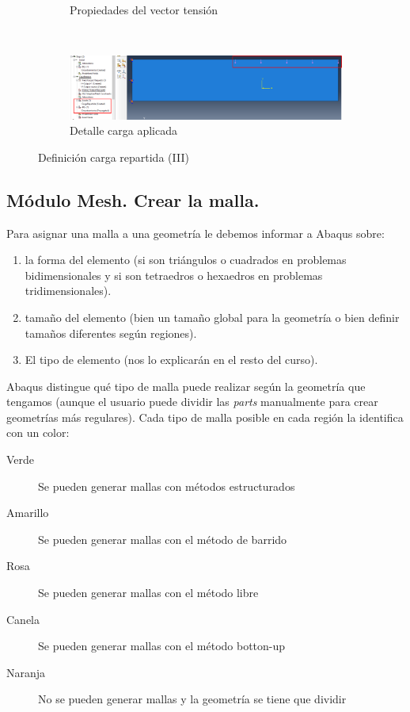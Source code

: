 \begin{enumerate}
\begin{figure}[H]
\begin{subfigure}{0.30\textwidth}
      \caption{Propiedades del vector tensión}
      \label{figu49}
    \end{subfigure}%
    ~ %
    \begin{subfigure}{0.67\textwidth}
      \includegraphics[width=\textwidth]{./body/images/imagen50.pdf}
      \caption{Detalle carga aplicada }
      \label{figu50}
    \end{subfigure}%
    \caption{Definición carga repartida (III)}
  \end{figure}
\end{enumerate}
\newpage

\subsection{Módulo Mesh. Crear la malla.}
Para asignar una malla a una geometría le debemos informar a Abaqus
sobre:
\begin{enumerate}
\item la forma del elemento (si son triángulos o cuadrados en
  problemas bidimensionales y si son tetraedros o hexaedros en
  problemas tridimensionales).
\item tamaño del elemento (bien un tamaño global para la geometría o
  bien definir tamaños diferentes según regiones).
\item El tipo de elemento (nos lo explicarán en el resto del curso).
\end{enumerate}

Abaqus distingue qué tipo de malla puede realizar según la geometría
que tengamos (aunque el usuario puede dividir las \textit{parts}
manualmente para crear geometrías más regulares). Cada tipo de malla
posible en cada región la identifica con un color:
\begin{description}
\item[Verde] Se pueden generar mallas con métodos estructurados
\item[Amarillo] Se pueden generar mallas con el método de barrido
\item[Rosa] Se pueden generar mallas con el método libre
\item[Canela] Se pueden generar mallas con el método botton-up
\item[Naranja] No se pueden generar mallas y la geometría se tiene que
  dividir
\end{description}

